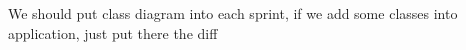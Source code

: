 \nextItem We should put class diagram into each sprint, if we add some classes into application, just put there the diff
